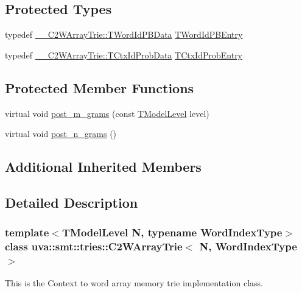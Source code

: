 \subsection*{Protected Types}
\begin{DoxyCompactItemize}
\item 
typedef \hyperlink{structuva_1_1smt_1_1tries_1_1_____c2_w_array_trie_1_1_t_word_id_p_b_data}{\+\_\+\+\_\+\+C2\+W\+Array\+Trie\+::\+T\+Word\+Id\+P\+B\+Data} \hyperlink{classuva_1_1smt_1_1tries_1_1_c2_w_array_trie_a8682efe5667cc07ac24d2f682a707ed9}{T\+Word\+Id\+P\+B\+Entry}
\item 
typedef \hyperlink{structuva_1_1smt_1_1tries_1_1_____c2_w_array_trie_1_1_t_ctx_id_prob_data}{\+\_\+\+\_\+\+C2\+W\+Array\+Trie\+::\+T\+Ctx\+Id\+Prob\+Data} \hyperlink{classuva_1_1smt_1_1tries_1_1_c2_w_array_trie_a23dd42dc1e2c2270217b7a0692740082}{T\+Ctx\+Id\+Prob\+Entry}
\end{DoxyCompactItemize}
\subsection*{Protected Member Functions}
\begin{DoxyCompactItemize}
\item 
virtual void \hyperlink{classuva_1_1smt_1_1tries_1_1_c2_w_array_trie_a44a4ab43b5d827ec7b05fca21aff109d}{post\+\_\+m\+\_\+grams} (const \hyperlink{namespaceuva_1_1smt_1_1tries_a20577a44b3a42d26524250634379b7cb}{T\+Model\+Level} level)
\item 
virtual void \hyperlink{classuva_1_1smt_1_1tries_1_1_c2_w_array_trie_a0467fe0af646410c8234fcfe00ee218a}{post\+\_\+n\+\_\+grams} ()
\end{DoxyCompactItemize}
\subsection*{Additional Inherited Members}


\subsection{Detailed Description}
\subsubsection*{template$<$T\+Model\+Level N, typename Word\+Index\+Type$>$class uva\+::smt\+::tries\+::\+C2\+W\+Array\+Trie$<$ N, Word\+Index\+Type $>$}

This is the Context to word array memory trie implementation class.

